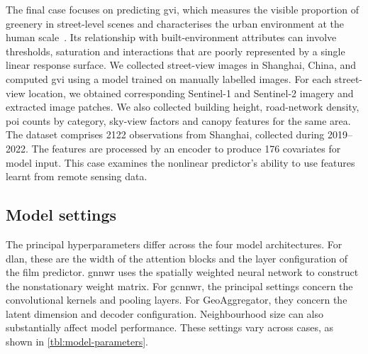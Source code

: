 \documentclass[]{interact}
\newcommand{\DLAN}{\gls{dlan}\xspace}
\newcommand{\GNNWR}{\gls{gnnwr}\xspace}
\newcommand{\GCNNWR}{\gls{gcnnwr}\xspace}
\newcommand{\GAgg}{GeoAggregator\xspace}
\begin{document}
The final case focuses on predicting \gls{gvi}, which measures the visible proportion of greenery in street-level scenes and characterises the urban environment at the human scale~\citep{LiZhang-2015,BiljeckiIto-2021}.
Its relationship with built-environment attributes can involve thresholds,
saturation and interactions that are poorly represented by a single linear response surface.
We collected street-view images in Shanghai, China, and computed \gls{gvi} using a model trained on manually labelled images.
For each street-view location, we obtained corresponding Sentinel-1 and Sentinel-2 imagery and extracted image patches.
We also collected building height, road-network density, \gls{poi} counts by category, sky-view factors and canopy features for the same area.
The dataset comprises 2122 observations from Shanghai, collected during 2019--2022.
The features are processed by an encoder to produce 176 covariates for model input.
This case examines the nonlinear predictor's ability to use features learnt from remote sensing data.

\subsection{Model settings}\label{sec:model-settings}

The principal hyperparameters differ across the four model architectures.
For \DLAN, these are the width of the attention blocks and the layer configuration of the \gls{film} predictor.
\GNNWR uses the spatially weighted neural network to construct the nonstationary weight matrix.
For \GCNNWR, the principal settings concern the convolutional kernels and pooling layers.
For \GAgg, they concern the latent dimension and decoder configuration.
Neighbourhood size can also substantially affect model performance.
These settings vary across cases, as shown in \autoref{tbl:model-parameters}.
\end{document}

